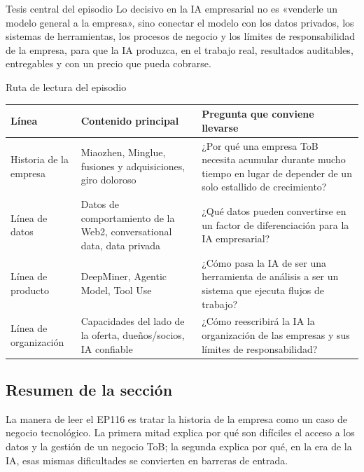 \begin{importantbox}{Tesis central del episodio}
Lo decisivo en la IA empresarial no es «venderle un modelo general a la empresa», sino conectar el modelo con los datos privados, los sistemas de herramientas, los procesos de negocio y los límites de responsabilidad de la empresa, para que la IA produzca, en el trabajo real, resultados auditables, entregables y con un precio que pueda cobrarse.
\end{importantbox}

\begin{knowledgebox}{Ruta de lectura del episodio}
\begin{tabularx}{\textwidth}{p{}p{}X}
\toprule
Línea & Contenido principal & Pregunta que conviene llevarse \\
\midrule
Historia de la empresa & Miaozhen, Minglue, fusiones y adquisiciones, giro doloroso & ¿Por qué una empresa ToB necesita acumular durante mucho tiempo en lugar de depender de un solo estallido de crecimiento? \\
Línea de datos & Datos de comportamiento de la Web2, conversational data, data privada & ¿Qué datos pueden convertirse en un factor de diferenciación para la IA empresarial? \\
Línea de producto & DeepMiner, Agentic Model, Tool Use & ¿Cómo pasa la IA de ser una herramienta de análisis a ser un sistema que ejecuta flujos de trabajo? \\
Línea de organización & Capacidades del lado de la oferta, dueños/socios, IA confiable & ¿Cómo reescribirá la IA la organización de las empresas y sus límites de responsabilidad? \\
\bottomrule
\end{tabularx}
\end{knowledgebox}

\subsection{Resumen de la sección}

La manera de leer el EP116 es tratar la historia de la empresa como un caso de negocio tecnológico. La primera mitad explica por qué son difíciles el acceso a los datos y la gestión de un negocio ToB; la segunda explica por qué, en la era de la IA, esas mismas dificultades se convierten en barreras de entrada.
